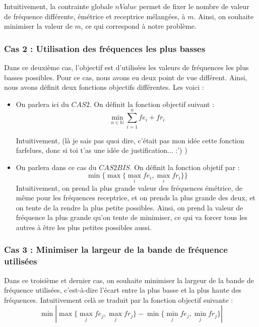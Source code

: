 \documentclass[a4paper, 10pt]{article}
\begin{document}
        Intuitivement, la contrainte globale $nValue$ permet de fixer le nombre de valeur de fréquence différente, émétrice et receptrice mélangées, à $m$. Ainsi, on souhaite minimiser la valeur de $m$, ce qui correspond à notre problème.

      \subsubsection{Cas 2 : Utilisation des fréquences les plus basses}

        Dans ce deuxième cas, l'objectif est d'utilisées les valeurs de fréquences les plus basses possibles. Pour ce cas, nous avons eu deux point de vue différent. Ainsi, nous avons définit deux fonctions objectifs différentes. Les voici :
        \begin{itemize}
          \item On parlera ici du $CAS 2$. On définit la fonction objectif suivant :
                $$ \displaystyle{\min_{n \in \mathbb{N}} \sum_{i=1}^{n} fe_i + fr_i } $$

                Intuitivement, (là je sais pas quoi dire, c'était pas mon idée cette fonction farfelues, donc si toi t'as une idée de justification... :') )
           \item On parlera dans ce cas du $CAS 2BIS$. On définit la fonction objetif par :
                 $$ \displaystyle{\min \{ \max \{ \max_{i} fe_i , \max_{i} fr_i \} \}} $$
                 Intuitivement, on prend la plus grande valeur des fréquences émétrice, de même pour les fréquences receptrice, et on prends la plus grande des deux, et on tente de la rendre la plus petite possibles. Ainsi, on prend la valeur de fréquence la plus grande qu'on tente de minimiser, ce qui va forcer tous les autres à être les plus petites possibles aussi.
        \end{itemize}

      \subsubsection{Cas 3 : Minimiser la largeur de la bande de fréquence utilisées}

        Dans ce troisième et dernier cas, on souhaite minimiser la largeur de la bande de fréquence utilisées, c'est-à-dire l'écart entre la plus basse et la plus haute des fréquences. Intuitivement celà se traduit par la fonction objectif suivante :
        $$ \displaystyle{ \min_{} | \max_{} \{\max_{j} fe_j, \max_{j} fr_j\}  - \min_{} \{\min_{j} fe_j, \min_{j} fr_j\}  |} $$
\end{document}
